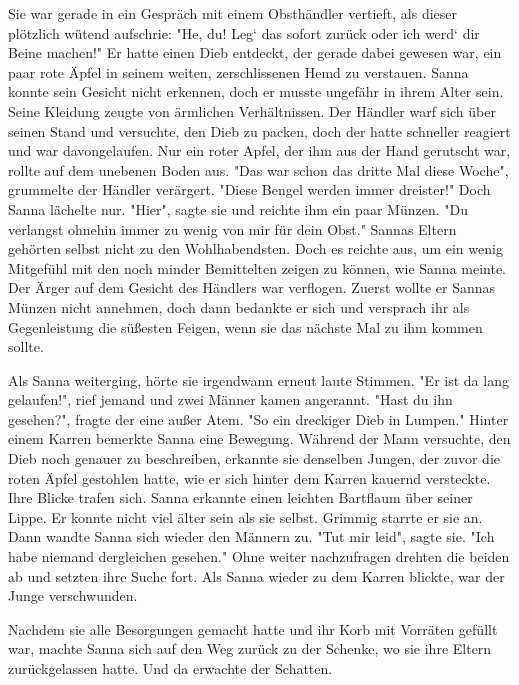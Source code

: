 \documentclass[10pt, a4paper, oneside]{book}
\begin{document}
\begin{multicols}{2}
Sie war gerade in ein Gespräch mit einem Obsthändler vertieft, als dieser plötzlich wütend aufschrie: "He, du! Leg‘ das sofort zurück oder ich werd‘ dir Beine machen!" Er hatte einen Dieb entdeckt, der gerade dabei gewesen war, ein paar rote Äpfel in seinem weiten, zerschlissenen Hemd zu verstauen. Sanna konnte sein Gesicht nicht erkennen, doch er musste ungefähr in ihrem Alter sein. Seine Kleidung zeugte von ärmlichen Verhältnissen. Der Händler warf sich über seinen Stand und versuchte, den Dieb zu packen, doch der hatte schneller reagiert und war davongelaufen. Nur ein roter Apfel, der ihm aus der Hand gerutscht war, rollte auf dem unebenen Boden aus. "Das war schon das dritte Mal diese Woche", grummelte der Händler verärgert. "Diese Bengel werden immer dreister!" Doch Sanna lächelte nur. "Hier", sagte sie und reichte ihm ein paar Münzen. "Du verlangst ohnehin immer zu wenig von mir für dein Obst." Sannas Eltern gehörten selbst nicht zu den Wohlhabendsten. Doch es reichte aus, um ein wenig Mitgefühl mit den noch minder Bemittelten zeigen zu können, wie Sanna meinte. Der Ärger auf dem Gesicht des Händlers war verflogen. Zuerst wollte er Sannas Münzen nicht annehmen, doch dann bedankte er sich und versprach ihr als Gegenleistung die süßesten Feigen, wenn sie das nächste Mal zu ihm kommen sollte.\bigskip

Als Sanna weiterging, hörte sie irgendwann erneut laute Stimmen. "Er ist da lang gelaufen!", rief jemand und zwei Männer kamen angerannt. "Hast du ihn gesehen?", fragte der eine außer Atem. "So ein dreckiger Dieb in Lumpen." Hinter einem Karren bemerkte Sanna eine Bewegung. Während der Mann versuchte, den Dieb noch genauer zu beschreiben, erkannte sie denselben Jungen, der zuvor die roten Äpfel gestohlen hatte, wie er sich hinter dem Karren kauernd versteckte. Ihre Blicke trafen sich. Sanna erkannte einen leichten Bartflaum über seiner Lippe. Er konnte nicht viel älter sein als sie selbst. Grimmig starrte er sie an. Dann wandte Sanna sich wieder den Männern zu. "Tut mir leid", sagte sie. "Ich habe niemand dergleichen gesehen." Ohne weiter nachzufragen drehten die beiden ab und setzten ihre Suche fort. Als Sanna wieder zu dem Karren blickte, war der Junge verschwunden.\bigskip

Nachdem sie alle Besorgungen gemacht hatte und ihr Korb mit Vorräten gefüllt war, machte Sanna sich auf den Weg zurück zu der Schenke, wo sie ihre Eltern zurückgelassen hatte. Und da erwachte der Schatten.\bigskip


\end{multicols}
\end{document}
